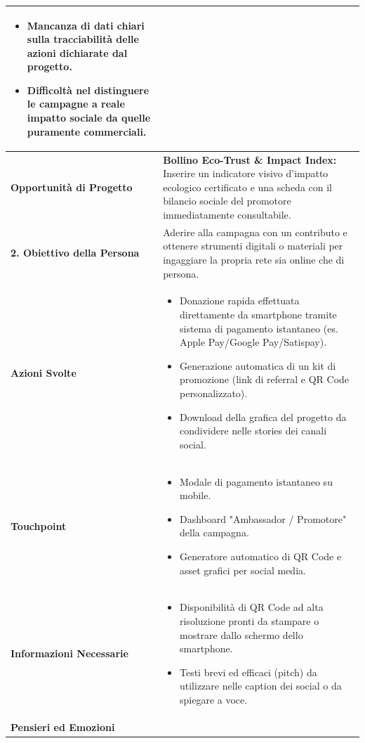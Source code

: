 \documentclass[11pt,a4paper]{article}
\begin{document}
\begin{table}[h!]
\begin{tabular}{|p{3.2cm}|p{11.8cm}|}
\begin{itemize}[leftmargin=*,nosep]
    \item Mancanza di dati chiari sulla tracciabilità delle azioni dichiarate dal progetto.
    \item Difficoltà nel distinguere le campagne a reale impatto sociale da quelle puramente commerciali.
\end{itemize} \\ \hline
\textbf{Opportunità di Progetto} &
\textbf{Bollino Eco-Trust \& Impact Index:} Inserire un indicatore visivo d'impatto ecologico certificato e una scheda con il bilancio sociale del promotore immediatamente consultabile. \\ \hline
\hline
\textbf{2. Obiettivo della Persona} & Aderire alla campagna con un contributo e ottenere strumenti digitali o materiali per ingaggiare la propria rete sia online che di persona. \\ \hline
\textbf{Azioni Svolte} &
\begin{itemize}[leftmargin=*,nosep]
    \item Donazione rapida effettuata direttamente da smartphone tramite sistema di pagamento istantaneo (es. Apple Pay/Google Pay/Satispay).
    \item Generazione automatica di un kit di promozione (link di referral e QR Code personalizzato).
    \item Download della grafica del progetto da condividere nelle stories dei canali social.
\end{itemize} \\ \hline
\textbf{Touchpoint} &
\begin{itemize}[leftmargin=*,nosep]
    \item Modale di pagamento istantaneo su mobile.
    \item Dashboard "Ambassador / Promotore" della campagna.
    \item Generatore automatico di QR Code e asset grafici per social media.
\end{itemize} \\ \hline
\textbf{Informazioni Necessarie} &
\begin{itemize}[leftmargin=*,nosep]
    \item Disponibilità di QR Code ad alta risoluzione pronti da stampare o mostrare dallo schermo dello smartphone.
    \item Testi brevi ed efficaci (pitch) da utilizzare nelle caption dei social o da spiegare a voce.
\end{itemize} \\ \hline
\textbf{Pensieri ed Emozioni} &

\end{tabular}
\end{table}
\end{document}
